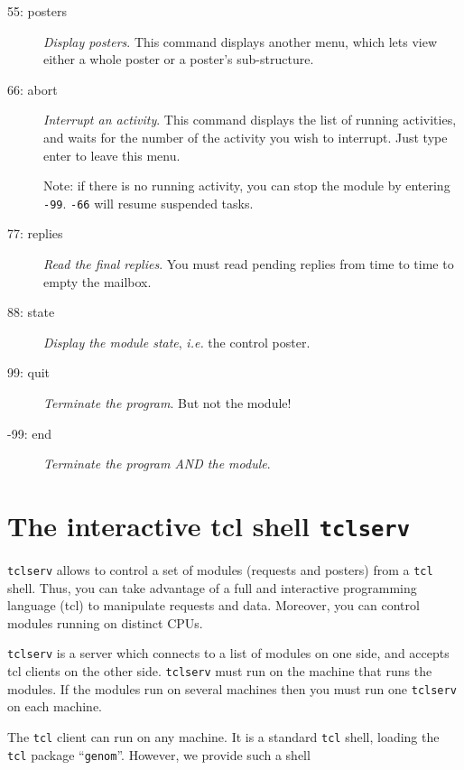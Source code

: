 \begin{description}
\item[55: posters] \emph{Display posters}. This command displays another
menu, which lets view either a whole poster or a poster's sub-structure.

\item[66: abort] \emph{Interrupt an activity}. This command displays the
list of running activities, and waits for the number of the activity you
wish to interrupt. Just type enter to leave this menu.

Note: if there is no running activity, you can stop the module by
entering \texttt{-99}. \texttt{-66} will resume suspended tasks.

\item[77: replies] \emph{Read the final replies}. You must read pending
replies from time to time to empty the mailbox.

\item[88: state] \emph{Display the module state}, \emph{i.e.} the control
poster.

\item[99: quit] \emph{Terminate the program}. But not the module!

\item[-99: end] \emph{Terminate the program AND the module}.
\end{description}


\section{The interactive tcl shell \texttt{tclserv}}
\label{sec|tcl}

\texttt{tclserv} allows to control a set of modules (requests and posters)
from a \texttt{tcl} shell. Thus, you can take advantage of a full and
interactive programming language (tcl) to manipulate requests and data.
Moreover, you can control modules running on distinct CPUs.


\texttt{tclserv} is a server which  connects to  a  list of modules on  one
side, and accepts  tcl clients on  the other side. \texttt{tclserv} must run
on the machine that runs the modules. If the modules run on several machines
then you must run one \texttt{tclserv} on each machine. 

The \texttt{tcl} client can run on any machine. It is a standard 
\texttt{tcl} shell, loading the \texttt{tcl} package ``\texttt{genom}''. However, we
provide such a shell 


